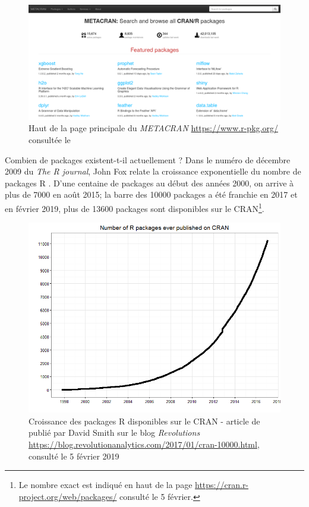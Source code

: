 \documentclass[]{article}
\begin{document}
\begin{figure}
\centering
\includegraphics{img/chap2/metacran.png}
\caption{Haut de la page principale du \emph{METACRAN} \url{https://www.r-pkg.org/} consultée le}
\end{figure}

Combien de packages existent-t-il actuellement ? Dans le numéro de décembre 2009 du \emph{The R journal}, John Fox relate la croissance exponentielle du nombre de packages R \citep{fox_aspects_2009}. D'une centaine de packages au début des années 2000, on arrive à plus de 7000 en août 2015; la barre des 10000 packages a été franchie en 2017 et en février 2019, plus de 13600 packages sont disponibles sur le CRAN\footnote{Le nombre exact est indiqué en haut de la page \url{https://cran.r-project.org/web/packages/} consulté le 5 février.}.

\begin{figure}
\centering
\includegraphics{img/chap2/package2017.png}
\caption{Croissance des packages R disponibles sur le CRAN - article de publié par David Smith sur le blog \emph{Revolutions} \url{https://blog.revolutionanalytics.com/2017/01/cran-10000.html}, consulté le 5 février 2019}
\end{figure}
\end{document}
